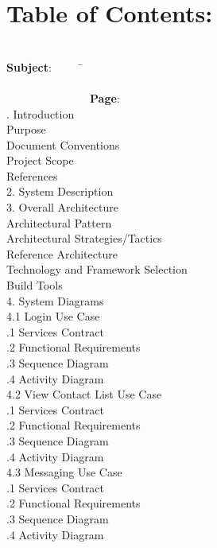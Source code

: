 \documentclass[29pt,a4paper]{moderncv}
\begin{document}
\section{\textbf{Table of Contents:}}
\begin{tabbing}
\\\textbf{Subject}: ~~~~~\= ~~~~~~~~~~~~~~~~~~~~~~~~~~~~~~~~~~~~~~~~~~~~~~~~~~~~~~~~~~~~~~~~~~~~~~~~~~~~~~~~~~~~~~~\= \textbf{Page}:
\\. Introduction \> \\							
 Purpose 	\\							
 Document Conventions 					\\
 Project Scope 							\\
 References 							\\
2. System Description \> 					\\
3. Overall Architecture \> 				\\
 Architectural Pattern  				\\
 Architectural Strategies/Tactics 					\\
 Reference Architecture 			\\
 Technology and Framework Selection 		\\
 Build Tools 							\\
4. System Diagrams \> \\
4.1 Login Use Case \> \\
.1 Services Contract \\
.2 Functional Requirements \\
.3 Sequence Diagram \\
.4 Activity Diagram \\
4.2 View Contact List Use Case \> \\
.1 Services Contract \\
.2 Functional Requirements \\
.3 Sequence Diagram \\
.4 Activity Diagram \\
4.3 Messaging Use Case \> \\
.1 Services Contract \\
.2 Functional Requirements \\
.3 Sequence Diagram \\
.4 Activity Diagram \\

\end{tabbing}
\end{document}
